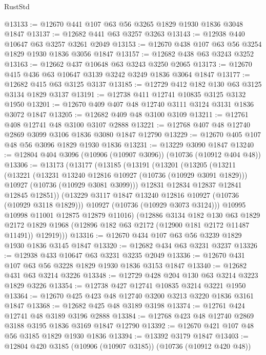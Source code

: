 \begin{lexlean}{RustStd}
\begin{coremodule}
@13133 := @12670 @441 @107 @63 @56 @3265 @1829 @1930 @1836 @3048 @1847
@13137 := @12682 @441 @63 @3257 @3263
@13143 := @12938 @440 @10647 @63 @3257 @3261 @2049
@13153 := @12670 @438 @107 @63 @56 @3254 @1829 @1930 @1836 @3056 @1847
@13157 := @12682 @438 @63 @3243 @3252
@13163 := @12662 @437 @10648 @63 @3243 @3250 @2065
@13173 := @12670 @415 @436 @63 @10647 @3139 @3242 @3249 @1836 @3064 @1847
@13177 := @12682 @415 @63 @3125 @3137
@13185 := @12729 @412 @182 @130 @63 @3125 @3134 @1829 @3137
@13191 := @12738 @411 @12741 @10835 @3125 @3132 @1950
@13201 := @12670 @409 @407 @48 @12740 @3111 @3124 @3131 @1836 @3072 @1847
@13205 := @12682 @409 @48 @3100 @3109
@13211 := @12761 @408 @12741 @48 @3100 @3107 @2888
@13221 := @12768 @407 @48 @12740 @2869 @3099 @3106 @1836 @3080 @1847 @12790
@13229 := @12670 @405 @107 @48 @56 @3096 @1829 @1930 @1836
@13231 := @13229 @3090 @1847
@13240 := @12804 @404 @3096 (@10906 (@10907 @3096)) (@10736 (@10912 @404 @48))
@13306 := @13173
    (@13177
      (@13185
        (@13191
          (@13201
            (@13205
              (@13211
                (@13221
                  (@13231 @13240 @12816 @10927 (@10736 (@10929 @3091 @1829)))
                  @10927
                  (@10736 (@10929 @3081 @3099)))
                @12831
                @12834
                @12837
                @12841
                @12845
                @12851))
            (@13229 @3117 @1847 @13240 @12816 @10927 (@10736 (@10929 @3118 @1829)))
            @10927
            (@10736 (@10929 @3073 @3124)))
          @10995
          @10998
          @11001
          @12875
          @12879
          @11016)
        (@12886
          @3134
          @182
          @130
          @63
          @1829
          @2172
          @1829
          @1968
          (@12896 @182 @63 @2172 (@12900 @181 @2172 @11487 @11491))
          @12919)))
@13316 := @12670 @434 @107 @63 @56 @3239 @1829 @1930 @1836 @3145 @1847
@13320 := @12682 @434 @63 @3231 @3237
@13326 := @12938 @433 @10647 @63 @3231 @3235 @2049
@13336 := @12670 @431 @107 @63 @56 @3228 @1829 @1930 @1836 @3153 @1847
@13340 := @12682 @431 @63 @3214 @3226
@13348 := @12729 @428 @204 @130 @63 @3214 @3223 @1829 @3226
@13354 := @12738 @427 @12741 @10835 @3214 @3221 @1950
@13364 := @12670 @425 @423 @48 @12740 @3200 @3213 @3220 @1836 @3161 @1847
@13368 := @12682 @425 @48 @3189 @3198
@13374 := @12761 @424 @12741 @48 @3189 @3196 @2888
@13384 := @12768 @423 @48 @12740 @2869 @3188 @3195 @1836 @3169 @1847 @12790
@13392 := @12670 @421 @107 @48 @56 @3185 @1829 @1930 @1836
@13394 := @13392 @3179 @1847
@13403 := @12804 @420 @3185 (@10906 (@10907 @3185)) (@10736 (@10912 @420 @48))

\end{coremodule}
\end{lexlean}
